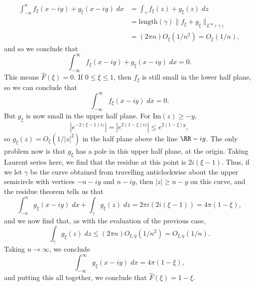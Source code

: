 \begin{example}
	\begin{align*}
		\int_{-n}^n f_\xi(x - iy) + g_\xi(x - iy)\; dx &= \int_\gamma f_\xi(z) + g_\xi(z)\; dz\\
		&= \text{length}(\gamma) \| f_\xi + g_\xi \|_{L^\infty(\gamma)}\\
		&= (2 \pi n) O_\xi(1/n^2) = O_\xi(1/n),
	\end{align*}
	and so we conclude that
	\[ \int_{-\infty}^\infty f_\xi(x - iy) + g_\xi(x - iy)\; dx = 0. \]
	This means $\widehat{F}(\xi) = 0$. If $0 \leq \xi \leq 1$, then $f_\xi$ is still small in the lower half plane, so we can conclude that
	\[ \int_{-\infty}^\infty f_\xi(x - iy)\; dx = 0. \]
	But $g_\xi$ is now small in the upper half plane. For $\text{Im}(z) \geq -y$,
	\[ |e^{-2(\xi - 1)iz}| = |e^{2(1 - \xi)iz}| \leq e^{2(1 - \xi)y}, \] 
	so $g_\xi(z) = O_\xi(1/|z|^2)$ in the half plane above the line $\RR - iy$. The only problem now is that $g_\xi$ has a pole in this upper half plane, at the origin. Taking Laurent series here, we find that the residue at this point is $2i(\xi - 1)$. Thus, if we let $\gamma$ be the curve obtained from travelling anticlockwise about the upper semicircle with vertices $-n - iy$ and $n - iy$, then $|z| \geq n - y$ on this curve, and the residue theorem tells us that
	\[ \int_{-n}^n g_\xi(x - iy)\; dx + \int_\gamma g_\xi(z)\; dz = 2\pi i (2i(\xi - 1)) = 4 \pi (1 - \xi), \]
	and we now find that, as with the evaluation of the previous case,
	\[ \int_\gamma g_\xi(z)\; dz \leq (2 \pi n) O_{\xi,y}(1/n^2) = O_{\xi,y}(1/n). \]
	Taking $n \to \infty$, we conclude
	\[ \int_{-\infty}^\infty g_\xi(x - iy)\; dx = 4 \pi (1 - \xi), \]
	and putting this all together, we conclude that $\widehat{F}(\xi) = 1 - \xi$.
\end{example}

